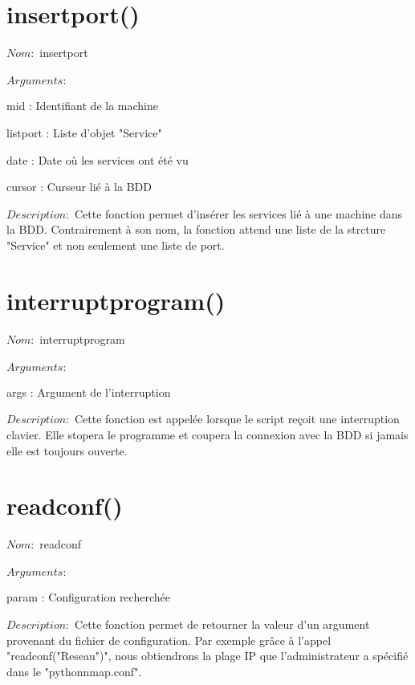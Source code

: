 \documentclass[12pt]{report}
\begin{document}
		\section{insertport()}
			{\setlength{\parindent}{0cm}
			$Nom :$ insertport\\\\
			}
			$Arguments :$
			\begin{description}
				\item mid : Identifiant de la machine
				\item listport : Liste d'objet "Service"
				\item date : Date où les services ont été vu
				\item cursor : Curseur lié à la BDD\\
			\end{description}
			$Description : $ Cette fonction permet d'insérer les services lié à une machine dans la BDD. Contrairement à son nom, la fonction attend une liste de la strcture "Service" et non seulement une liste de port.
		\section{interruptprogram()}
			{\setlength{\parindent}{0cm}
			$Nom :$ interruptprogram\\\\
			}
			$Arguments :$
			\begin{description}
				\item *args : Argument de l'interruption\\
			\end{description}
			$Description : $ Cette fonction est appelée lorsque le script reçoit une interruption clavier. Elle stopera le programme et coupera la connexion avec la BDD si jamais elle est toujours ouverte.
		\section{readconf()}
			{\setlength{\parindent}{0cm}
			$Nom :$ readconf\\\\
			}
			$Arguments :$
			\begin{description}
				\item param : Configuration recherchée\\
			\end{description}
			$Description : $ Cette fonction permet de retourner la valeur d'un argument provenant du fichier de configuration. Par exemple grâce à l'appel "readconf("Reseau")", nous obtiendrons la plage IP que l'administrateur a spécifié dans le "pythonnmap.conf".
\end{document}
